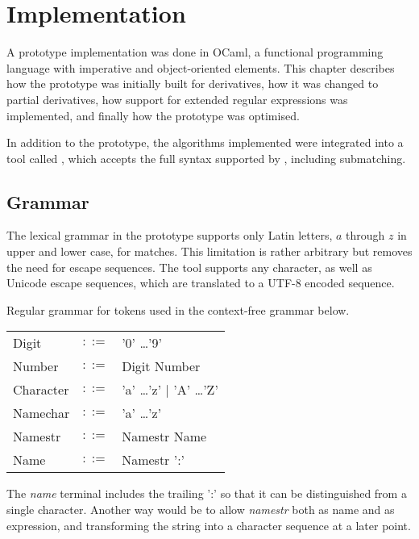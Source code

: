 \chapter{Implementation}
\label{implementation}

A prototype implementation was done in OCaml, a functional programming language
with imperative and object-oriented elements. This chapter describes how the
prototype was initially built for derivatives, how it was changed to partial
derivatives, how support for extended regular expressions was implemented, and
finally how the prototype was optimised.

In addition to the prototype, the algorithms implemented were integrated into a
tool called \dreml, which accepts the full syntax supported by \ocamllex,
including submatching.



\section{Grammar}

The lexical grammar in the prototype supports only Latin letters, $a$ through
$z$ in upper and lower case, for matches. This limitation is rather arbitrary
but removes the need for escape sequences. The \dreml{} tool supports any
character, as well as Unicode escape sequences, which are translated to a UTF-8
encoded sequence.

\begin{defn}
   \label{defn-gram-reg}
   Regular grammar for tokens used in the context-free grammar below.

   \begin{tabular}{lrl}
      Digit	& $::=$	& '0' \dots '9'				\\
      Number	& $::=$	& Digit Number				\\
      Character	& $::=$	& 'a' \dots 'z' $|$ 'A' \dots 'Z'	\\
      Namechar	& $::=$	& 'a' \dots 'z'				\\
      Namestr	& $::=$	& Namestr Name				\\
      Name	& $::=$	& Namestr ':'				\\
   \end{tabular}
\end{defn}

The \textit{name} terminal includes the trailing ':' so that it can be
distinguished from a single character. Another way would be to allow
\textit{namestr} both as name and as expression, and transforming the string
into a character sequence at a later point.

